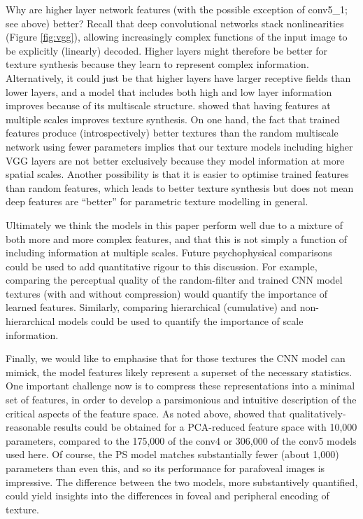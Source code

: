 \documentclass[doc, 11pt,a4paper,natbib]{apa6}\usepackage[]{graphicx}\usepackage[]{color}
\begin{document}
Why are higher layer network features (with the possible exception of conv5\_1; see above) better?
Recall that deep convolutional networks stack nonlinearities (Figure \ref{fig:vgg}), allowing increasingly complex functions of the input image to be explicitly (linearly) decoded. 
Higher layers might therefore be better for texture synthesis because they learn to represent complex information.
Alternatively, it could just be that higher layers have larger receptive fields than lower layers, and a model that includes both high and low layer information improves because of its multiscale structure.
\citet{ustyuzhaninov_texture_2016} showed that having features at multiple scales improves texture synthesis.
On one hand, the fact that trained features produce (introspectively) better textures than the random multiscale network using fewer parameters implies that our texture models including higher VGG layers are not better exclusively because they model information at more spatial scales.
Another possibility is that it is easier to optimise trained features than random features, which leads to better texture synthesis but does not mean deep features are ``better'' for parametric texture modelling in general.

Ultimately we think the models in this paper perform well due to a mixture of both more and more complex features, and that this is not simply a function of including information at multiple scales.
Future psychophysical comparisons could be used to add quantitative rigour to this discussion.
For example, comparing the perceptual quality of the random-filter and trained CNN model textures (with and without compression) would quantify the importance of learned features.
Similarly, comparing hierarchical (cumulative) and non-hierarchical models could be used to quantify the importance of scale information.

Finally, we would like to emphasise that for those textures the CNN model can mimick, the model features likely represent a superset of the necessary statistics.
One important challenge now is to compress these representations into a minimal set of features, in order to develop a parsimonious and intuitive description of the critical aspects of the feature space.
As noted above, \citet{gatys_texture_2015-1} showed that qualitatively-reasonable results could be obtained for a PCA-reduced feature space with 10,000 parameters, compared to the 175,000 of the conv4 or 306,000 of the conv5 models used here.
Of course, the PS model matches substantially fewer (about 1,000) parameters than even this, and so its performance for parafoveal images is impressive. 
The difference between the two models, more substantively quantified, could yield insights into the differences in foveal and peripheral encoding of texture.
\end{document}
